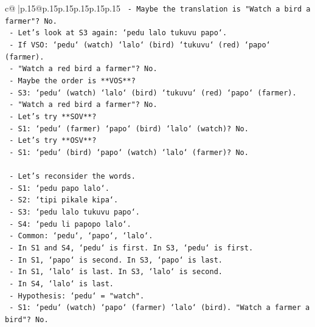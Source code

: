 \documentclass{article}
\begin{document}
{\begin{supertabular}{c@{$\;$}|p{.15\linewidth}@{}p{.15\linewidth}p{.15\linewidth}p{.15\linewidth}p{.15\linewidth}p{.15\linewidth}}
{{{\texttt{                     {-} Maybe the translation is "Watch a bird a farmer"? No.} \\
\texttt{                   {-} Let's look at S3 again: `pedu lalo tukuvu papo`.} \\
\texttt{                     {-} If VSO: `pedu` (watch) `lalo` (bird) `tukuvu` (red) `papo` (farmer).} \\
\texttt{                     {-} "Watch a red bird a farmer"? No.} \\
\texttt{                     {-} Maybe the order is **VOS**?} \\
\texttt{                       {-} S3: `pedu` (watch) `lalo` (bird) `tukuvu` (red) `papo` (farmer).} \\
\texttt{                       {-} "Watch a red bird a farmer"? No.} \\
\texttt{                   {-} Let's try **SOV**?} \\
\texttt{                     {-} S1: `pedu` (farmer) `papo` (bird) `lalo` (watch)? No.} \\
\texttt{                   {-} Let's try **OSV**?} \\
\texttt{                     {-} S1: `pedu` (bird) `papo` (watch) `lalo` (farmer)? No.} \\
\\ 
\texttt{                 {-} Let's reconsider the words.} \\
\texttt{                   {-} S1: `pedu papo lalo`.} \\
\texttt{                   {-} S2: `tipi pikale kipa`.} \\
\texttt{                   {-} S3: `pedu lalo tukuvu papo`.} \\
\texttt{                   {-} S4: `pedu li papopo lalo`.} \\
\texttt{                   {-} Common: `pedu`, `papo`, `lalo`.} \\
\texttt{                   {-} In S1 and S4, `pedu` is first. In S3, `pedu` is first.} \\
\texttt{                   {-} In S1, `papo` is second. In S3, `papo` is last.} \\
\texttt{                   {-} In S1, `lalo` is last. In S3, `lalo` is second.} \\
\texttt{                   {-} In S4, `lalo` is last.} \\
\texttt{                   {-} Hypothesis: `pedu` = "watch".} \\
\texttt{                     {-} S1: `pedu` (watch) `papo` (farmer) `lalo` (bird). "Watch a farmer a bird"? No.} \\
}}}
\end{supertabular}}
\end{document}
